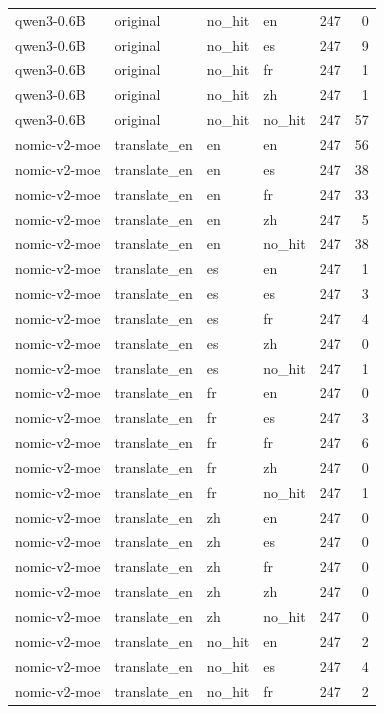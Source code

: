 \begin{tabular}{llllrr}
qwen3-0.6B & original & no\_hit & en & 247 & 0 \\
qwen3-0.6B & original & no\_hit & es & 247 & 9 \\
qwen3-0.6B & original & no\_hit & fr & 247 & 1 \\
qwen3-0.6B & original & no\_hit & zh & 247 & 1 \\
qwen3-0.6B & original & no\_hit & no\_hit & 247 & 57 \\
nomic-v2-moe & translate\_en & en & en & 247 & 56 \\
nomic-v2-moe & translate\_en & en & es & 247 & 38 \\
nomic-v2-moe & translate\_en & en & fr & 247 & 33 \\
nomic-v2-moe & translate\_en & en & zh & 247 & 5 \\
nomic-v2-moe & translate\_en & en & no\_hit & 247 & 38 \\
nomic-v2-moe & translate\_en & es & en & 247 & 1 \\
nomic-v2-moe & translate\_en & es & es & 247 & 3 \\
nomic-v2-moe & translate\_en & es & fr & 247 & 4 \\
nomic-v2-moe & translate\_en & es & zh & 247 & 0 \\
nomic-v2-moe & translate\_en & es & no\_hit & 247 & 1 \\
nomic-v2-moe & translate\_en & fr & en & 247 & 0 \\
nomic-v2-moe & translate\_en & fr & es & 247 & 3 \\
nomic-v2-moe & translate\_en & fr & fr & 247 & 6 \\
nomic-v2-moe & translate\_en & fr & zh & 247 & 0 \\
nomic-v2-moe & translate\_en & fr & no\_hit & 247 & 1 \\
nomic-v2-moe & translate\_en & zh & en & 247 & 0 \\
nomic-v2-moe & translate\_en & zh & es & 247 & 0 \\
nomic-v2-moe & translate\_en & zh & fr & 247 & 0 \\
nomic-v2-moe & translate\_en & zh & zh & 247 & 0 \\
nomic-v2-moe & translate\_en & zh & no\_hit & 247 & 0 \\
nomic-v2-moe & translate\_en & no\_hit & en & 247 & 2 \\
nomic-v2-moe & translate\_en & no\_hit & es & 247 & 4 \\
nomic-v2-moe & translate\_en & no\_hit & fr & 247 & 2 \\

\end{tabular}
